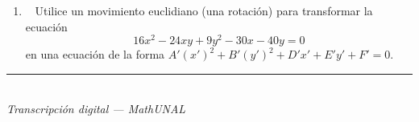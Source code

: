 \documentclass[11pt]{article}
\newcommand{\ptsbox}[1]{\fbox{\footnotesize #1}~}
\newcommand{\examfooter}{%
  \vfill
  \rule{\linewidth}{0.4pt}\\[1pt]
  {\scriptsize\textit{Transcripción digital --- MathUNAL}\hfill\textcolor{unalblue}{\textbf{\thepage}}}
}
\begin{document}
\begin{enumerate}[leftmargin=1.6em]

\item \ptsbox{16 pts} Utilice un movimiento euclidiano (una rotación) para transformar la ecuación
\[
16x^2 - 24xy + 9y^2 - 30x - 40y = 0
\]
en una ecuación de la forma $A'(x')^2 + B'(y')^2 + D'x' + E'y' + F' = 0$.

\vspace{100pt}

\end{enumerate}

\examfooter
\end{document}
